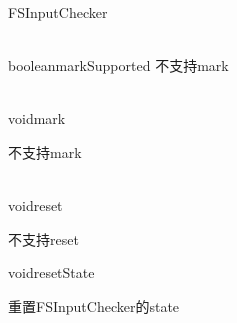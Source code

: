 \begin{XeClass}{FSInputChecker}
\begin{XeMethod}{\XeFinal \\ \XePublic}{boolean}{markSupported}
 不支持mark

    \end{XeMethod}

    \begin{XeMethod}{\XeFinal \\ \XePublic}{void}{mark}
         
 不支持mark

    \end{XeMethod}

    \begin{XeMethod}{\XeFinal \\ \XePublic}{void}{reset}
         
 不支持reset

    \end{XeMethod}

    \begin{XeMethod}{\XePrivate}{void}{resetState}
         
 重置FSInputChecker的state

    \end{XeMethod}

\end{XeClass}
